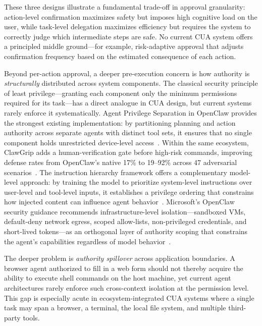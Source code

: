 These three designs illustrate a fundamental trade-off in approval granularity: action-level confirmation maximizes safety but imposes high cognitive load on the user, while task-level delegation maximizes efficiency but requires the system to correctly judge which intermediate steps are safe. No current CUA system offers a principled middle ground---for example, risk-adaptive approval that adjusts confirmation frequency based on the estimated consequence of each action.

Beyond per-action approval, a deeper pre-execution concern is how authority is \emph{structurally} distributed across system components. The classical security principle of least privilege---granting each component only the minimum permissions required for its task---has a direct analogue in CUA design, but current systems rarely enforce it systematically. Agent Privilege Separation in OpenClaw provides the strongest existing implementation: by partitioning planning and action authority across separate agents with distinct tool sets, it ensures that no single component holds unrestricted device-level access~\cite{agentprivsep2026}. Within the same ecosystem, ClawGrip adds a human-verification gate before high-risk commands, improving defense rates from OpenClaw's native 17\% to 19--92\% across 47 adversarial scenarios~\cite{shan2026dontletclawgrip}. The instruction hierarchy framework offers a complementary model-level approach: by training the model to prioritize system-level instructions over user-level and tool-level inputs, it establishes a privilege ordering that constrains how injected content can influence agent behavior~\cite{instructionhierarchy2024}. Microsoft's OpenClaw security guidance recommends infrastructure-level isolation---sandboxed VMs, default-deny network egress, scoped allow-lists, non-privileged credentials, and short-lived tokens---as an orthogonal layer of authority scoping that constrains the agent's capabilities regardless of model behavior~\cite{msOpenClawSafety2026}.

The deeper problem is \emph{authority spillover} across application boundaries. A browser agent authorized to fill in a web form should not thereby acquire the ability to execute shell commands on the host machine, yet current agent architectures rarely enforce such cross-context isolation at the permission level. This gap is especially acute in ecosystem-integrated CUA systems where a single task may span a browser, a terminal, the local file system, and multiple third-party tools.

